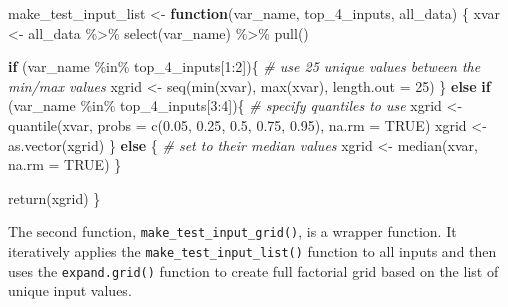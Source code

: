 \documentclass[
]{article}
\newenvironment{Shaded}{\begin{snugshade}}{\end{snugshade}}
\newcommand{\AttributeTok}[1]{\textcolor[rgb]{0.77,0.63,0.00}{#1}}
\newcommand{\CommentTok}[1]{\textcolor[rgb]{0.56,0.35,0.01}{\textit{#1}}}
\newcommand{\ConstantTok}[1]{\textcolor[rgb]{0.00,0.00,0.00}{#1}}
\newcommand{\ControlFlowTok}[1]{\textcolor[rgb]{0.13,0.29,0.53}{\textbf{#1}}}
\newcommand{\DecValTok}[1]{\textcolor[rgb]{0.00,0.00,0.81}{#1}}
\newcommand{\FloatTok}[1]{\textcolor[rgb]{0.00,0.00,0.81}{#1}}
\newcommand{\FunctionTok}[1]{\textcolor[rgb]{0.00,0.00,0.00}{#1}}
\newcommand{\NormalTok}[1]{#1}
\newcommand{\OtherTok}[1]{\textcolor[rgb]{0.56,0.35,0.01}{#1}}
\newcommand{\SpecialCharTok}[1]{\textcolor[rgb]{0.00,0.00,0.00}{#1}}
\begin{document}
\begin{Shaded}
\begin{Highlighting}[]
\NormalTok{make\_test\_input\_list }\OtherTok{\textless{}{-}} \ControlFlowTok{function}\NormalTok{(var\_name, top\_4\_inputs, all\_data)}
\NormalTok{\{}
\NormalTok{  xvar }\OtherTok{\textless{}{-}}\NormalTok{ all\_data }\SpecialCharTok{\%\textgreater{}\%} \FunctionTok{select}\NormalTok{(var\_name) }\SpecialCharTok{\%\textgreater{}\%} \FunctionTok{pull}\NormalTok{()}
  
  \ControlFlowTok{if}\NormalTok{ (var\_name }\SpecialCharTok{\%in\%}\NormalTok{ top\_4\_inputs[}\DecValTok{1}\SpecialCharTok{:}\DecValTok{2}\NormalTok{])\{}
    \CommentTok{\# use 25 unique values between the min/max values}
\NormalTok{    xgrid }\OtherTok{\textless{}{-}} \FunctionTok{seq}\NormalTok{(}\FunctionTok{min}\NormalTok{(xvar), }\FunctionTok{max}\NormalTok{(xvar), }\AttributeTok{length.out =} \DecValTok{25}\NormalTok{)}
\NormalTok{  \} }\ControlFlowTok{else} \ControlFlowTok{if}\NormalTok{ (var\_name }\SpecialCharTok{\%in\%}\NormalTok{ top\_4\_inputs[}\DecValTok{3}\SpecialCharTok{:}\DecValTok{4}\NormalTok{])\{}
    \CommentTok{\# specify quantiles to use}
\NormalTok{    xgrid }\OtherTok{\textless{}{-}} \FunctionTok{quantile}\NormalTok{(xvar, }\AttributeTok{probs =} \FunctionTok{c}\NormalTok{(}\FloatTok{0.05}\NormalTok{, }\FloatTok{0.25}\NormalTok{, }\FloatTok{0.5}\NormalTok{, }\FloatTok{0.75}\NormalTok{, }\FloatTok{0.95}\NormalTok{), }\AttributeTok{na.rm =} \ConstantTok{TRUE}\NormalTok{)}
\NormalTok{    xgrid }\OtherTok{\textless{}{-}} \FunctionTok{as.vector}\NormalTok{(xgrid)}
\NormalTok{  \} }\ControlFlowTok{else}\NormalTok{ \{}
    \CommentTok{\# set to their median values}
\NormalTok{    xgrid }\OtherTok{\textless{}{-}} \FunctionTok{median}\NormalTok{(xvar, }\AttributeTok{na.rm =} \ConstantTok{TRUE}\NormalTok{)}
\NormalTok{  \}}
  
  \FunctionTok{return}\NormalTok{(xgrid)}
\NormalTok{\}}
\end{Highlighting}
\end{Shaded}

The second function, \texttt{make\_test\_input\_grid()}, is a wrapper
function. It iteratively applies the \texttt{make\_test\_input\_list()}
function to all inputs and then uses the \texttt{expand.grid()} function
to create full factorial grid based on the list of unique input values.
\end{document}
